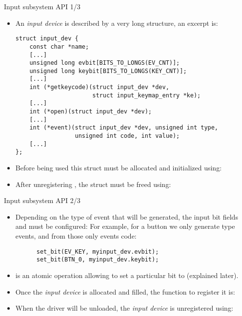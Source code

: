 \begin{frame}[fragile]{Input subsystem API 1/3}
  \begin{itemize}
  \item An {\em input device} is described by a very long
     structure, an excerpt is:
    \begin{block}{}
    \begin{verbatim}
struct input_dev {
    const char *name;
    [...]
    unsigned long evbit[BITS_TO_LONGS(EV_CNT)];
    unsigned long keybit[BITS_TO_LONGS(KEY_CNT)];
    [...]
    int (*getkeycode)(struct input_dev *dev,
                      struct input_keymap_entry *ke);
    [...]
    int (*open)(struct input_dev *dev);
    [...]
    int (*event)(struct input_dev *dev, unsigned int type,
                 unsigned int code, int value);
    [...]
};
\end{verbatim}
\end{block}
\item Before being used this struct must be allocated and initialized
  using: 
\item After unregistering , the struct must be freed
  using: 
  \end{itemize}
\end{frame}

\begin{frame}[fragile]{Input subsystem API 2/3}
  \begin{itemize}
  \item Depending on the type of event that will be generated, the
    input bit fields  and  must be configured:
    For example, for a button we only generate
     type events, and from those only  events
    code:
    \begin{block}{}
    \begin{verbatim}
      set_bit(EV_KEY, myinput_dev.evbit);
      set_bit(BTN_0, myinput_dev.keybit);
    \end{verbatim}
    \end{block}
  \item {} is an atomic operation allowing to set a particular bit 
        to  (explained later).
  \item Once the {\em input device} is allocated and filled, the
    function to register it
    is: 
  \item When the driver will be unloaded, the {\em input device} is
    unregistered using:
  \end{itemize}
\end{frame}

